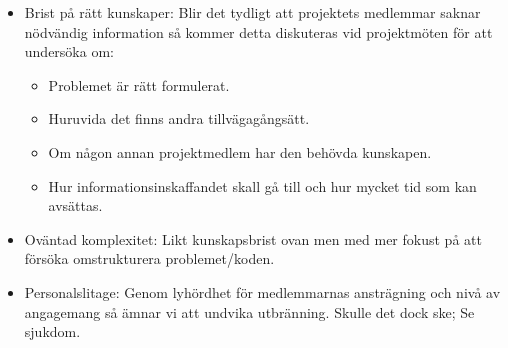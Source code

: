 \documentclass[paper=a4, fontsize=11pt,twoside]{article}
\begin{document}
\begin{itemize}
\item Brist på rätt kunskaper:
Blir det tydligt att projektets medlemmar saknar nödvändig information så kommer detta diskuteras vid projektmöten för att undersöka om: 
\begin{itemize}
\item Problemet är rätt formulerat.
\item Huruvida det finns andra tillvägagångsätt.
\item Om någon annan projektmedlem har den behövda kunskapen. 
\item Hur informationsinskaffandet skall gå till och hur mycket tid som kan avsättas.
\end{itemize}
\item Oväntad komplexitet:
Likt kunskapsbrist ovan men med mer fokust på att försöka omstrukturera problemet/koden.

\item Personalslitage:
Genom lyhördhet för medlemmarnas ansträgning och nivå av angagemang så ämnar vi att undvika utbränning. Skulle det dock ske; Se sjukdom.
\end{itemize}
\end{document}
